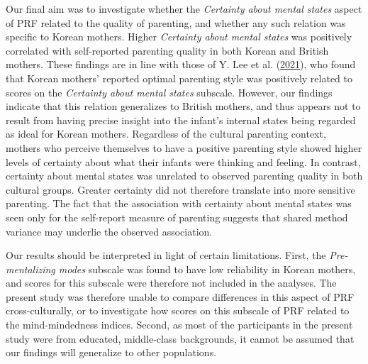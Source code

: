 \documentclass[
]{article}
\begin{document}
Our final aim was to investigate whether the \emph{Certainty about mental states} aspect of PRF related to the quality of parenting, and whether any such relation was specific to Korean mothers. Higher \emph{Certainty about mental states} was positively correlated with self-reported parenting quality in both Korean and British mothers. These findings are in line with those of Y. Lee et al. (\protect\hyperlink{ref-Lee2021}{2021}), who found that Korean mothers' reported optimal parenting style was positively related to scores on the \emph{Certainty about mental states} subscale. However, our findings indicate that this relation generalizes to British mothers, and thus appears not to result from having precise insight into the infant's internal states being regarded as ideal for Korean mothers. Regardless of the cultural parenting context, mothers who perceive themselves to have a positive parenting style showed higher levels of certainty about what their infants were thinking and feeling. In contrast, certainty about mental states was unrelated to observed parenting quality in both cultural groups. Greater certainty did not therefore translate into more sensitive parenting. The fact that the association with certainty about mental states was seen only for the self-report measure of parenting suggests that shared method variance may underlie the observed association.

Our results should be interpreted in light of certain limitations. First, the \emph{Pre-mentalizing modes} subscale was found to have low reliability in Korean mothers, and scores for this subscale were therefore not included in the analyses. The present study was therefore unable to compare differences in this aspect of PRF cross-culturally, or to investigate how scores on this subscale of PRF related to the mind-mindedness indices. Second, as most of the participants in the present study were from educated, middle-class backgrounds, it cannot be assumed that our findings will generalize to other populations.
\end{document}
